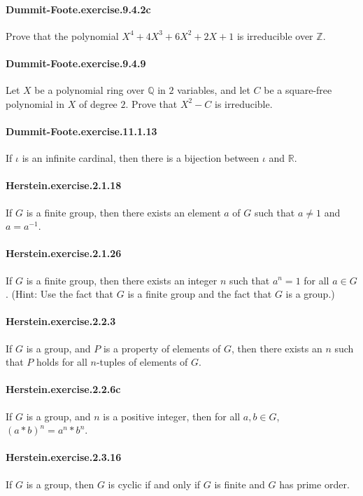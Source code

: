\documentclass{article}
\begin{document}
\paragraph{Dummit-Foote.exercise.9.4.2c} Prove that the polynomial $X^4 + 4X^3 + 6X^2 + 2X + 1$ is irreducible over $\mathbb{Z}$.

\paragraph{Dummit-Foote.exercise.9.4.9} Let $X$ be a polynomial ring over $\mathbb{Q}$ in $2$ variables, and let $C$ be a square-free polynomial in $X$ of degree $2$. Prove that $X^2 - C$ is irreducible.

\paragraph{Dummit-Foote.exercise.11.1.13} If $ι$ is an infinite cardinal, then there is a bijection between $ι$ and $\mathbb{R}$.

\paragraph{Herstein.exercise.2.1.18} If $G$ is a finite group, then there exists an element $a$ of $G$ such that $a \neq 1$ and $a = a^{-1}$.

\paragraph{Herstein.exercise.2.1.26} If $G$ is a finite group, then there exists an integer $n$ such that $a^n=1$ for all $a \in G$. (Hint: Use the fact that $G$ is a finite group and the fact that $G$ is a group.)

\paragraph{Herstein.exercise.2.2.3} If $G$ is a group, and $P$ is a property of elements of $G$, then there exists an $n$ such that $P$ holds for all $n$-tuples of elements of $G$.

\paragraph{Herstein.exercise.2.2.6c} If $G$ is a group, and $n$ is a positive integer, then for all $a, b \in G$, $(a * b) ^ n = a ^ n * b ^ n$.

\paragraph{Herstein.exercise.2.3.16} If $G$ is a group, then $G$ is cyclic if and only if $G$ is finite and $G$ has prime order.
\end{document}
